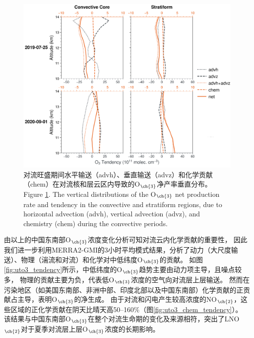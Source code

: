 \begin{figure}[H]
\centering
\includegraphics[width=\textwidth]{./figures/tendency_o3_classification.png}
\caption{
对流旺盛期间水平输送（advh）、垂直输送（advz）和化学贡献（chem）在对流核和层云区内导致的O$_{\ch{3}}$净产率垂直分布。
\\
Figure \ref{fig:tendency_o3_classification}. The vertical distributions of the O$_{\ch{3}}$ net production rate and tendency in the convective and stratiform regions, due to horizontal advection (advh), vertical advection (advz), and chemistry (chem) during the convective periods.
}
\label{fig:tendency_o3_classification}
\end{figure}

由以上的中国东南部O$_{\ch{3}}$浓度变化分析可知对流云内化学贡献的重要性，
因此我们进一步利用MERRA2-GMI的3小时平均模式结果，分析了动力（大尺度输送）、物理（湍流和对流）和化学对中低纬度O$_{\ch{3}}$的贡献。
如图\ref{fig:uto3_tendency}所示，中低纬度的O$_{\ch{3}}$趋势主要由动力项主导，且噪点较多，
物理的贡献主要为负，代表低O$_{\ch{3}}$浓度的空气向对流层上层输送。
然而在污染地区（如美国东南部、非洲中部、印度北部以及中国东南部）化学贡献的正贡献占主导，表明O$_{\ch{3}}$的净生成。
由于对流和闪电产生较高浓度的NO$_{\ch{2}}$，这些区域的正化学贡献在阴天比晴天高50--160\%（图\ref{fig:uto3_chem_tendency}）。
该结果与中国东南部O$_{\ch{3}}$在整个对流生命期的变化及来源相符，突出了LNO$_{\ch{2}}$对于夏季对流层上层O$_{\ch{3}}$浓度的长期影响。

